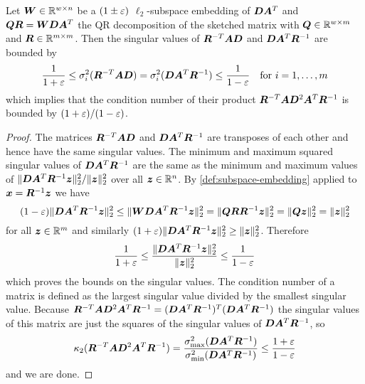 \begin{theorem} \label{thm:condition-number-bound}
Let \(\bm{W} \in \mathbb{R}^{w \times n}\) be a \((1 \pm \varepsilon)\) \(\ell_2\)-subspace embedding of \(\bm{D}\bm{A}^T\) and \(\bm{Q}\bm{R} = \bm{W}\bm{D}\bm{A}^T\) the QR decomposition of the sketched matrix with \(\bm{Q} \in \mathbb{R}^{w \times m}\) and \(\bm{R} \in \mathbb{R}^{m \times m}\). Then the singular values of \(\bm{R}^{-T}\bm{A}\bm{D}\) and \(\bm{D}\bm{A}^T \bm{R}^{-1}\) are bounded by
\[ \frac{1}{1 + \varepsilon} \leq \sigma_i^2(\bm{R}^{-T}\bm{A}\bm{D}) = \sigma_i^2(\bm{D}\bm{A}^T \bm{R}^{-1}) \leq \frac{1}{1 - \varepsilon} \quad \text{for } i = 1, \ldots, m \]
which implies that the condition number of their product \(\bm{R}^{-T} \bm{A} \bm{D}^2 \bm{A}^T \bm{R}^{-1}\) is bounded by \((1+\varepsilon) / (1-\varepsilon)\).
\end{theorem}
\begin{proof}
The matrices \(\bm{R}^{-T}\bm{A}\bm{D}\) and \(\bm{D}\bm{A}^T \bm{R}^{-1}\) are transposes of each other and hence have the same singular values.
The minimum and maximum squared singular values of \(\bm{D}\bm{A}^T \bm{R}^{-1}\) are the same as the minimum and maximum values of \( \lVert \bm{D}\bm{A}^T \bm{R}^{-1} \bm{z} \rVert_2^2 / \lVert \bm{z} \rVert_2^2\) over all \(\bm{z} \in \mathbb{R}^n\).
By \cref{def:subspace-embedding} applied to \(\bm{x} = \bm{R}^{-1} \bm{z}\) we have
\[
  (1-\varepsilon) \lVert \bm{D}\bm{A}^T \bm{R}^{-1} \bm{z} \rVert_2^2
  \leq \lVert \bm{W}\bm{D}\bm{A}^T \bm{R}^{-1}\bm{z} \rVert_2^2
  = \lVert \bm{Q}\bm{R} \bm{R}^{-1}\bm{z} \rVert_2^2
  = \lVert \bm{Q}\bm{z} \rVert_2^2
  = \lVert \bm{z} \rVert_2^2
\]
for all \(\bm{z} \in \mathbb{R}^m\) and similarly \((1+\varepsilon)\lVert \bm{D}\bm{A}^T \bm{R}^{-1} \bm{z} \rVert_2^2 \geq \lVert \bm{z} \rVert_2^2\).
Therefore
\[ \frac{1}{1 + \varepsilon} \leq \frac{\lVert \bm{D}\bm{A}^T \bm{R}^{-1} \bm{z} \rVert_2^2}{\lVert \bm{z} \rVert_2^2} \leq \frac{1}{1 - \varepsilon} \]
which proves the bounds on the singular values.
The condition number of a matrix is defined as the largest singular value divided by the smallest singular value.
Because \(\bm{R}^{-T} \bm{A} \bm{D}^2 \bm{A}^T \bm{R}^{-1} = (\bm{D} \bm{A}^T \bm{R}^{-1})^T (\bm{D} \bm{A}^T \bm{R}^{-1})\) the singular values of this matrix are just the squares of the singular values of \(\bm{D} \bm{A}^T \bm{R}^{-1}\), so
\[ \kappa_2(\bm{R}^{-T} \bm{A} \bm{D}^2 \bm{A}^T \bm{R}^{-1})
   = \frac{\sigma_{\max}^2(\bm{D} \bm{A}^T \bm{R}^{-1})}{\sigma_{\min}^2(\bm{D} \bm{A}^T \bm{R}^{-1})} \leq \frac{1+\varepsilon}{1-\varepsilon} \]
and we are done.
\end{proof}

